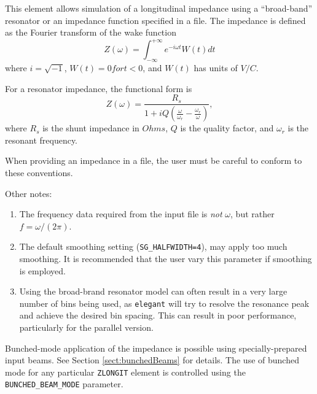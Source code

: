 This element allows simulation of a longitudinal impedance using a
``broad-band'' resonator or an impedance function specified in a file.
The impedance is defined as the Fourier transform of the wake function
\begin{equation}
Z(\omega) = \int_{-\infty}^{+\infty} e^{-i \omega t} W(t) dt
\end{equation}
where $i = \sqrt{-1}$, $W(t)=0 for t<0$, and $W(t)$ has units of $V/C$.

For a resonator impedance, the functional form is
\begin{equation}
Z(\omega) = \frac{R_s}{1 + iQ(\frac{\omega}{\omega_r} - \frac{\omega_r}{\omega})},
\end{equation}
where $R_s$ is the shunt impedance in $Ohms$, $Q$ is the quality
factor, and $\omega_r$ is the resonant frequency.

When providing an impedance in a file, the user must be careful to conform to these
conventions.

Other notes:
\begin{enumerate}
\item The frequency data required from the input file is {\em not} $\omega$, but rather
  $f = \omega/(2 \pi)$.
\item The default smoothing setting ({\tt SG\_HALFWIDTH=4}), may apply too much smoothing.
  It is recommended that the user vary this parameter if smoothing is employed.
\item Using the broad-brand resonator model can often result in a very large number of bins
 being used, as {\tt elegant} will try to resolve the resonance peak and achieve the desired
 bin spacing. This can result in poor performance, particularly for the parallel version.
\end{enumerate}

Bunched-mode application of the impedance is possible using specially-prepared input
beams. 
See Section \ref{sect:bunchedBeams} for details.
The use of bunched mode for any particular \verb|ZLONGIT| element is controlled using the \verb|BUNCHED_BEAM_MODE| parameter.
